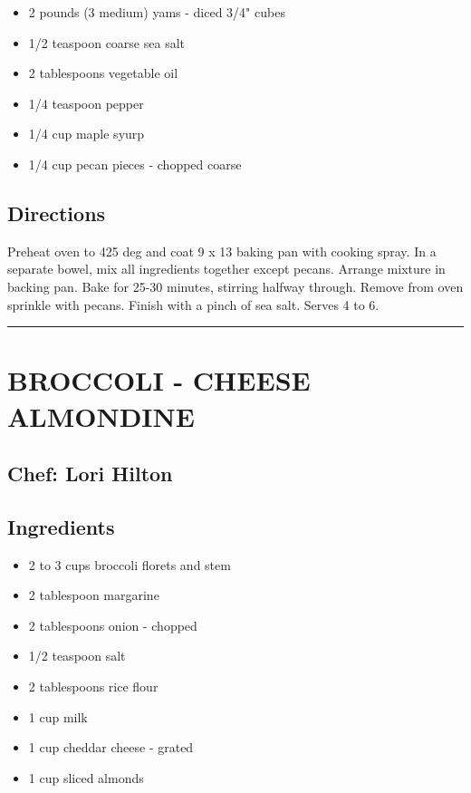 \documentclass[
]{book}
\providecommand{\tightlist}{%
  \setlength{\itemsep}{0pt}\setlength{\parskip}{0pt}}
\begin{document}
\begin{itemize}
\tightlist
\item
  2 pounds (3 medium) yams - diced 3/4" cubes
\item
  1/2 teaspoon coarse sea salt
\item
  2 tablespoons vegetable oil
\item
  1/4 teaspoon pepper
\item
  1/4 cup maple syurp
\item
  1/4 cup pecan pieces - chopped coarse
\end{itemize}

\hypertarget{directions-26}{%
\subsection*{Directions}\label{directions-26}}


Preheat oven to 425 deg and coat 9 x 13 baking pan with cooking spray.
In a separate bowel, mix all ingredients together except pecans.
Arrange mixture in backing pan. Bake for 25-30 minutes, stirring halfway through.
Remove from oven sprinkle with pecans. Finish with a pinch of sea salt. Serves 4 to 6.

\begin{center}\rule{0.5\linewidth}{0.5pt}\end{center}

\hypertarget{broccoli---cheese-almondine}{%
\section*{BROCCOLI - CHEESE ALMONDINE}\label{broccoli---cheese-almondine}}


\hypertarget{chef-lori-hilton-1}{%
\subsection*{Chef: Lori Hilton}\label{chef-lori-hilton-1}}


\hypertarget{ingredients-27}{%
\subsection*{Ingredients}\label{ingredients-27}}


\begin{itemize}
\tightlist
\item
  2 to 3 cups broccoli florets and stem
\item
  2 tablespoon margarine
\item
  2 tablespoons onion - chopped
\item
  1/2 teaspoon salt
\item
  2 tablespoons rice flour
\item
  1 cup milk
\item
  1 cup cheddar cheese - grated
\item
  1 cup sliced almonds
\end{itemize}
\end{document}
